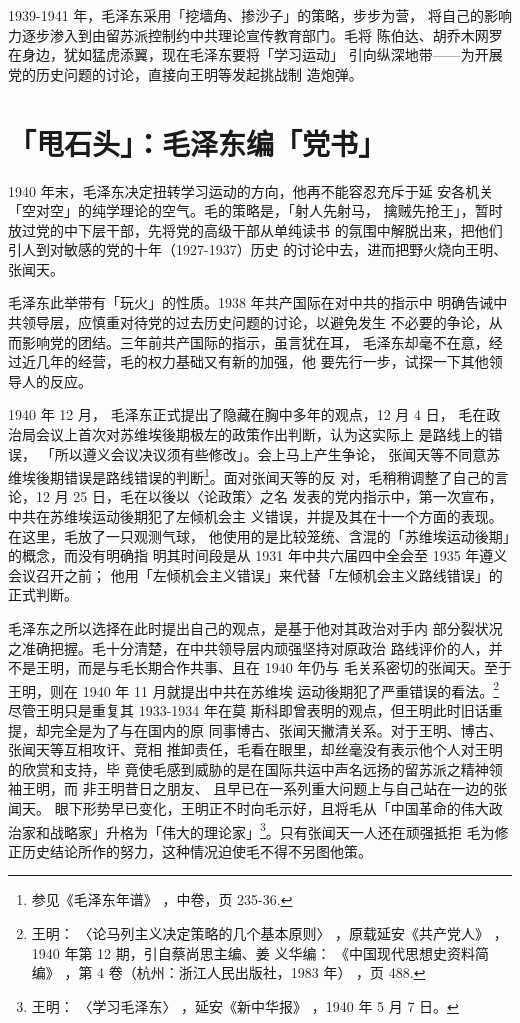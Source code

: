 1939-1941 年，毛泽东采用「挖墙角、掺沙子」的策略，步步为营，
将自己的影响力逐步渗入到由留苏派控制约中共理论宣传教育部门。毛将
陈伯达、胡乔木网罗在身边，犹如猛虎添翼，现在毛泽东要将「学习运动」
引向纵深地带——为开展党的历史问题的讨论，直接向王明等发起挑战制
造炮弹。

\section{「甩石头」：毛泽东编「党书」}
1940 年末，毛泽东决定扭转学习运动的方向，他再不能容忍充斥于延
安各机关「空对空」的纯学理论的空气。毛的策略是，「射人先射马，
擒贼先抢王」，暂时放过党的中下层干部，先将党的高级干部从单纯读书
的氛围中解脱出来，把他们引人到对敏感的党的十年（1927-1937）历史
的讨论中去，进而把野火烧向王明、张闻天。

毛泽东此举带有「玩火」的性质。1938 年共产国际在对中共的指示中
明确告诫中共领导层，应慎重对待党的过去历史问题的讨论，以避免发生
不必要的争论，从而影响党的团结。三年前共产国际的指示，虽言犹在耳，
毛泽东却毫不在意，经过近几年的经营，毛的权力基础又有新的加强，他
要先行一步，试探一下其他领导人的反应。

1940 年 12 月，
毛泽东正式提出了隐藏在胸中多年的观点，12 月 4 日，
毛在政治局会议上首次对苏维埃後期极左的政策作出判断，认为这实际上
是路线上的错误，
「所以遵义会议决议须有些修改」。会上马上产生争论，
张闻天等不同意苏维埃後期错误是路线错误的判断\footnote{参见《毛泽东年谱》
，中卷，页 235-36.}。面对张闻天等的反
对，毛稍稍调整了自己的言论，12 月 25 日，毛在以後以〈论政策〉之名
发表的党内指示中，第一次宣布，中共在苏维埃运动後期犯了左倾机会主
义错误，并提及其在十一个方面的表现。在这里，毛放了一只观测气球，
他使用的是比较笼统、含混的「苏维埃运动後期」的概念，而没有明确指
明其时间段是从 1931 年中共六届四中全会至 1935 年遵义会议召开之前；
他用「左倾机会主义错误」来代替「左倾机会主义路线错误」的正式判断。

毛泽东之所以选择在此时提出自己的观点，是基于他对其政治对手内
部分裂状况之准确把握。毛十分清楚，在中共领导层内顽强坚持对原政治
路线评价的人，并不是王明，而是与毛长期合作共事、且在 1940 年仍与
毛关系密切的张闻天。至于王明，则在 1940 年 11 月就提出中共在苏维埃
运动後期犯了严重错误的看法。\footnote{王明：
〈论马列主义决定策略的几个基本原则〉
，原载延安《共产党人》
，1940 年第 12 期，引自蔡尚思主编、姜
义华编：
《中国现代思想史资料简编》
，第 4 卷（杭州：浙江人民出版社，1983 年）
，页 488.} 尽管王明只是重复其 1933-1934 年在莫
斯科即曾表明的观点，但王明此时旧话重提，却完全是为了与在国内的原
同事博古、张闻天撇清关系。对于王明、博古、张闻天等互相攻讦、竞相
推卸责任，毛看在眼里，却丝毫没有表示他个人对王明的欣赏和支持，毕
竟使毛感到威胁的是在国际共运中声名远扬的留苏派之精神领袖王明，而
非王明昔日之朋友、
且早已在一系列重大问题上与自己站在一边的张闻天。
眼下形势早已变化，王明正不时向毛示好，且将毛从「中国革命的伟大政
治家和战略家」升格为「伟大的理论家」\footnote{王明：
〈学习毛泽东〉
，延安《新中华报》
，1940 年 5 月 7 日。}。只有张闻天一人还在顽强抵拒
毛为修正历史结论所作的努力，这种情况迫使毛不得不另图他策。
 
